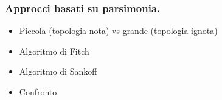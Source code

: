 \begin{frame}[fragile]
\frametitle{Approcci basati su parsimonia.}
\begin{itemize}
\item
Piccola (topologia nota) vs grande (topologia ignota)
\item
Algoritmo di Fitch
\item
Algoritmo di Sankoff
\item
Confronto
\end{itemize}
\end{frame}


